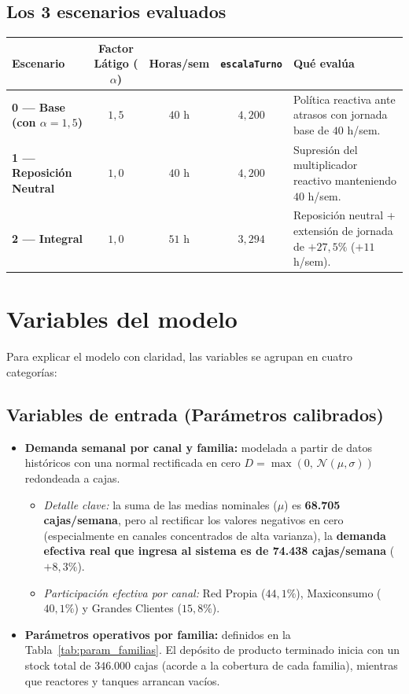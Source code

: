 \documentclass[11pt, a4paper]{article}
\begin{document}
\subsection{Los 3 escenarios evaluados}
\begin{table}[H]
\centering
\small
\begin{tabularx}{\textwidth}{l c c c L}
\toprule
\textbf{Escenario} & \textbf{Factor Látigo ($\alpha$)} & \textbf{Horas/sem} & \textbf{\texttt{escalaTurno}} & \textbf{Qué evalúa} \\
\midrule
\textbf{0 --- Base (con $\alpha=1,5$)} & $1,5$ & $40$ h & $4,200$ & Política reactiva ante atrasos con jornada base de $40$ h/sem. \\
\textbf{1 --- Reposición Neutral}     & $1,0$ & $40$ h & $4,200$ & Supresión del multiplicador reactivo manteniendo $40$ h/sem. \\
\textbf{2 --- Integral}               & $1,0$ & $51$ h & $3,294$ & Reposición neutral + extensión de jornada de $+27,5\%$ ($+11$ h/sem). \\
\bottomrule
\end{tabularx}
\end{table}

\section{Variables del modelo}

Para explicar el modelo con claridad, las variables se agrupan en cuatro categorías:

\subsection{Variables de entrada (Parámetros calibrados)}
\begin{itemize}[leftmargin=0.5cm, itemsep=2pt]
    \item \textbf{Demanda semanal por canal y familia:} modelada a partir de datos históricos con una normal rectificada en cero $D = \max(0,\, \mathcal{N}(\mu, \sigma))$ redondeada a cajas.
    \begin{itemize}[leftmargin=0.5cm, itemsep=1pt]
        \item \textit{Detalle clave:} la suma de las medias nominales ($\mu$) es \textbf{68.705 cajas/semana}, pero al rectificar los valores negativos en cero (especialmente en canales concentrados de alta varianza), la \textbf{demanda efectiva real que ingresa al sistema es de 74.438 cajas/semana} ($+8,3\%$).
        \item \textit{Participación efectiva por canal:} Red Propia ($44,1\%$), Maxiconsumo ($40,1\%$) y Grandes Clientes ($15,8\%$).
    \end{itemize}
    \item \textbf{Parámetros operativos por familia:} definidos en la Tabla~\ref{tab:param_familias}. El depósito de producto terminado inicia con un stock total de $346.000$ cajas (acorde a la cobertura de cada familia), mientras que reactores y tanques arrancan vacíos.
\end{itemize}
\end{document}
